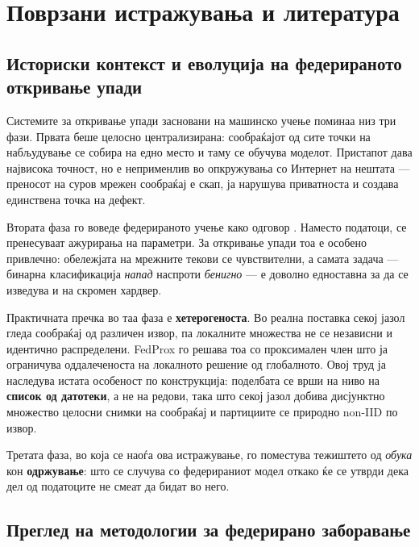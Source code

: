\chapter{Поврзани истражувања и литература}
\label{chap:related}

\section{Историски контекст и еволуција на федерираното откривање упади}

Системите за откривање упади засновани на машинско учење поминаа низ три фази. Првата беше
целосно централизирана: сообраќајот од сите точки на набљудување се собира на едно место и
таму се обучува моделот. Пристапот дава највисока точност, но е неприменлив во опкружувања
со Интернет на нештата --- преносот на суров мрежен сообраќај е скап, ја нарушува
приватноста и создава единствена точка на дефект.

Втората фаза го воведе федерираното учење како одговор \cite{mcmahan2017fedavg}. Наместо
податоци, се пренесуваат ажурирања на параметри. За откривање упади тоа е особено
привлечно: обележјата на мрежните текови се чувствителни, а самата задача --- бинарна
класификација \emph{напад} наспроти \emph{бенигно} --- е доволно едноставна за да се изведува и на
скромен хардвер.

Практичната пречка во таа фаза е \textbf{хетерогеноста}. Во реална поставка секој јазол гледа
сообраќај од различен извор, па локалните множества не се независни и идентично
распределени. FedProx \cite{li2020fedprox} го решава тоа со проксимален член што ја
ограничува оддалеченоста на локалното решение од глобалното. Овој труд ја наследува истата
особеност по конструкција: поделбата се врши на ниво на \textbf{список од датотеки}, а не на
редови, така што секој јазол добива дисјунктно множество целосни снимки на сообраќај и
партициите се природно non-IID по извор.

Третата фаза, во која се наоѓа ова истражување, го поместува тежиштето од \emph{обука} кон
\textbf{одржување}: што се случува со федерираниот модел откако ќе се утврди дека дел од
податоците не смеат да бидат во него.

\section{Преглед на методологии за федерирано заборавање}

